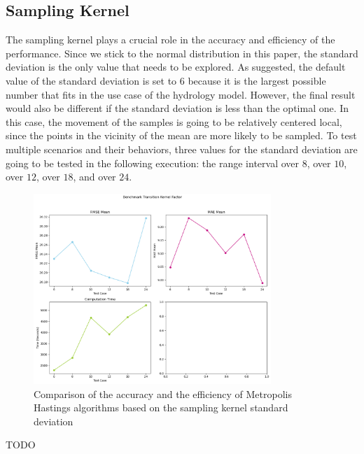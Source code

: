 \subsection{Sampling Kernel}
The sampling kernel plays a crucial role in the accuracy and efficiency of the performance. Since we stick to the normal distribution in this paper, the standard deviation is the only value that needs to be explored. As suggested, the default value of the standard deviation is set to $6$ because it is the largest possible number that fits in the use case of the hydrology model. However, the final result would also be different if the standard deviation is less than the optimal one. In this case, the movement of the samples is going to be relatively centered local, since the points in the vicinity of the mean are more likely to be sampled. To test multiple scenarios and their behaviors, three values for the standard deviation are going to be tested in the following execution: the range interval over $8$, over $10$, over $12$, over $18$, and over $24$.

\begin{figure}
    \centering
    \includegraphics[width=0.8\textwidth]{figures/basic_mh/benchmark/sensitivity_transition.png}
    \captionsetup{width=.8\textwidth}
    \caption{Comparison of the accuracy and the efficiency of Metropolis Hastings algorithms based on the sampling kernel standard deviation}
    \label{fig:enter-label}
\end{figure}

TODO

